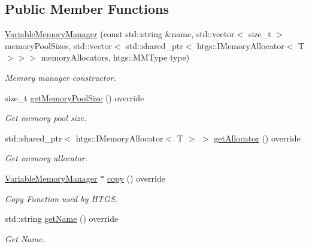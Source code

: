 \subsection*{Public Member Functions}
\begin{DoxyCompactItemize}
\item 
\hyperlink{classfi_1_1VariableMemoryManager_a7df31faaa03ce722f8eedb3e7275a8de}{Variable\+Memory\+Manager} (const std\+::string \&name, std\+::vector$<$ size\+\_\+t $>$ memory\+Pool\+Sizes, std\+::vector$<$ std\+::shared\+\_\+ptr$<$ htgs\+::\+I\+Memory\+Allocator$<$ T $>$$>$$>$ memory\+Allocators, htgs\+::\+M\+M\+Type type)
\begin{DoxyCompactList}\small\item\em Memory manager constructor. \end{DoxyCompactList}\item 
size\+\_\+t \hyperlink{classfi_1_1VariableMemoryManager_a781ac82a7b0c437ef36f1d17b31e4d3d}{get\+Memory\+Pool\+Size} () override
\begin{DoxyCompactList}\small\item\em Get memory pool size. \end{DoxyCompactList}\item 
std\+::shared\+\_\+ptr$<$ htgs\+::\+I\+Memory\+Allocator$<$ T $>$ $>$ \hyperlink{classfi_1_1VariableMemoryManager_aa5b46e9102d8f33f202e42ef33433a45}{get\+Allocator} () override
\begin{DoxyCompactList}\small\item\em Get memory allocator. \end{DoxyCompactList}\item 
\hyperlink{classfi_1_1VariableMemoryManager}{Variable\+Memory\+Manager} $\ast$ \hyperlink{classfi_1_1VariableMemoryManager_aeac9f9bf6ed6cb9a308d0e24c73a6ede}{copy} () override
\begin{DoxyCompactList}\small\item\em Copy Function used by H\+T\+GS. \end{DoxyCompactList}\item 
std\+::string \hyperlink{classfi_1_1VariableMemoryManager_a24ad349fc12308a924d62ecd2b37b4ad}{get\+Name} () override
\begin{DoxyCompactList}\small\item\em Get Name. \end{DoxyCompactList}\end{DoxyCompactItemize}
